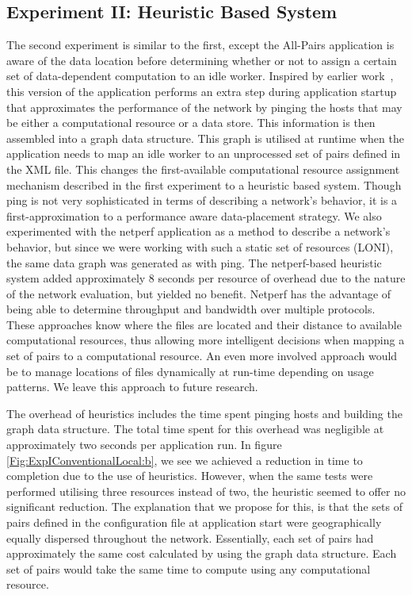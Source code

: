 \documentclass{rspublic}
\begin{document}
\subsection{Experiment II: Heuristic Based System}\label{Sec:Heuristic}
The second experiment is similar to the first, except the All-Pairs
application is aware of the data location before determining whether or
not to assign a certain set of data-dependent computation to an idle
worker. Inspired by earlier work~\citep{netperf}, this version of the
application performs an extra step during application startup that
approximates the performance of the network by pinging the hosts that
may be either a computational resource or a data store. This information
is then assembled into a graph data structure. This graph is utilised at
runtime when the application needs to map an idle worker to an
unprocessed set of pairs defined in the XML file. This changes the
first-available computational resource assignment mechanism described in
the first experiment to a heuristic based system. Though ping is not
very sophisticated in terms of describing a network's behavior, it is a
first-approximation to a performance aware data-placement strategy. We
also experimented with the netperf application \citep{netperf_web} as a
method to describe a network's behavior, but since we were working with
such a static set of resources (LONI), the same data graph was generated
as with ping. The netperf-based heuristic system added approximately 8
seconds per resource of overhead due to the nature of the network
evaluation, but yielded no benefit. Netperf has the advantage of being
able to determine throughput and bandwidth over multiple protocols.
These approaches know where the files are located and their distance to
available computational resources, thus allowing more intelligent
decisions when mapping a set of pairs to a computational resource. An
even more involved approach would be to manage locations of files
dynamically at run-time depending on usage patterns. We leave this
approach to future research. 

The overhead of heuristics includes the time spent pinging hosts and
building the graph data structure. The total time spent for this
overhead was negligible at approximately two seconds per application
run. In figure \ref{Fig:ExpIConventionalLocal:b}, we see we achieved a
reduction in time to completion due to the use of heuristics. However,
when the same tests were performed utilising three resources instead of
two, the heuristic seemed to offer no significant reduction. The
explanation that we propose for this, is that the sets of pairs defined
in the configuration file at application start were geographically
equally dispersed throughout the network. Essentially, each set of pairs
had approximately the same cost calculated by using the graph data
structure. Each set of pairs would take the same time to compute using
any computational resource.
\end{document}
